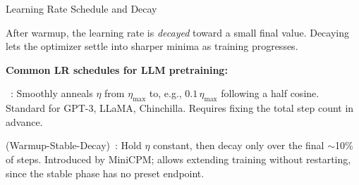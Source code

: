 \begin{frame}{Learning Rate Schedule and Decay}

  After warmup, the learning rate is \emph{decayed} toward a small final value.
  Decaying lets the optimizer settle into sharper minima as training progresses.

  \vspace{0.4em}
  \textbf{Common LR schedules for LLM pretraining:}

  \vspace{0.2em}
  \begin{center}
  \end{center}

  \vspace{0.2em}
  \begin{description}[labelwidth=\widthof{\bfseries Cosine decay~~}, leftmargin=!]
    \item[Cosine decay]~\cite{loshchilov2017sgdr}: Smoothly anneals $\eta$ from $\eta_{\max}$ to, e.g., $0.1\,\eta_{\max}$ following a half cosine. Standard for GPT-3, LLaMA, Chinchilla. Requires fixing the total step count in advance.
    \item[WSD] (Warmup-Stable-Decay)~\cite{hu2024minicpm}: Hold $\eta$ constant, then decay only over the final $\sim$10\% of steps. Introduced by MiniCPM; allows extending training without restarting, since the stable phase has no preset endpoint.
  \end{description}
\end{frame}

